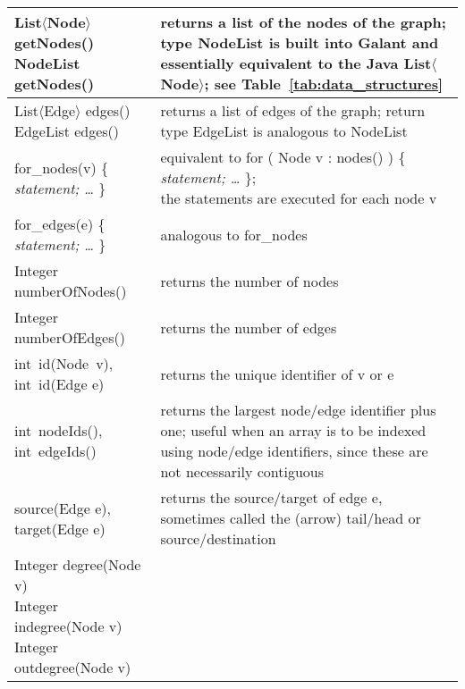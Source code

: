 \begin{table}
  \small
  \centering
  \begin{tabular}{| m{} | m{} |}
    \hline
    \shortstack[l]{
      \textsf{List$\langle$Node$\rangle$ getNodes()}\\
      \textsf{NodeList getNodes()}
    }
    &
    returns a list of the nodes of the graph; type \textsf{NodeList}
    is built into Galant
    and essentially equivalent to the Java \textsf{List$\langle$Node$\rangle$};
    see Table~\ref{tab:data_structures}
    \\ \hline
    \shortstack[l]{
      \textsf{List$\langle$Edge$\rangle$ edges()}\\
      \textsf{EdgeList edges()}
    }
    &
    returns a list of edges of the graph; return type
    \textsf{EdgeList} is analogous to \textsf{NodeList}
    \\ \hline
    \textsf{for\_nodes(v) \{
      \emph{statement; \ldots}
      \}}
    &
    \shortstack[l]{
      equivalent to
      \textsf{for ( Node v : nodes() ) \{ \emph{statement; \ldots} \}};\\
      the statements are executed for each node \textsf{v}
    }
    \\ \hline
    \textsf{for\_edges(e)  \{ \emph{statement; \ldots} \}}
    &
    analogous to \textsf{for\_nodes}
    \\ \hline
    \textsf{Integer numberOfNodes()}
    &
    returns the number of nodes
    \\ \hline
    \textsf{Integer numberOfEdges()}
    &
    returns the number of edges
    \\ \hline
    \textsf{int~id(Node~v)}, \textsf{int~id(Edge e)}
    &
    returns the unique identifier of \textsf{v} or \textsf{e}
    \\ \hline
    \textsf{int~nodeIds()}, \textsf{int~edgeIds()}
    &
    returns the largest node/edge identifier plus one;
    useful when an array is to be indexed using node/edge identifiers,
    since these are not necessarily contiguous
    \\ \hline
    \textsf{source(Edge e)}, \textsf{target(Edge e)}
    &
    returns the source/target of edge \textsf{e}, sometimes called the (arrow)
    tail/head or source/destination
    \\ \hline
    \shortstack[l]{
      \textsf{Integer degree(Node v)}\\
      \textsf{Integer indegree(Node v)}\\
      \textsf{Integer outdegree(Node v)}
}
\end{tabular}
\end{table}
